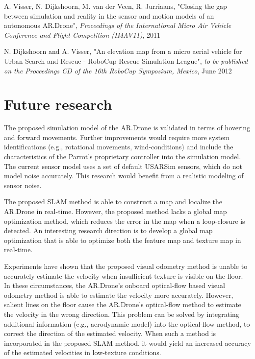 \vspace{\baselineskip}

A. Visser, N. Dijkshoorn, M. van der Veen, R. Jurriaans, "Closing the gap between simulation and reality in the sensor and motion models of an autonomous AR.Drone", \textit{Proceedings of the International Micro Air Vehicle Conference and Flight Competition (IMAV11)}, 2011

\vspace{\baselineskip}

N. Dijkshoorn and A. Visser, "An elevation map from a micro aerial vehicle for Urban Search and Rescue - RoboCup Rescue Simulation League", \textit{to be published on the Proceedings CD of the 16th RoboCup Symposium, Mexico}, June 2012

\section{Future research}
\label{sec:conclusions-future}

The proposed simulation model of the AR.Drone is validated in terms of hovering and forward movements. 
Further improvements would require more system identifications (e.g., rotational movements, wind-conditions) and include the characteristics of the Parrot's proprietary controller into the simulation model. 
The current sensor model uses a set of default USARSim sensors, which do not model noise accurately.
This research would benefit from a realistic modeling of sensor noise.

The proposed SLAM method is able to construct a map and localize the AR.Drone in real-time.
However, the proposed method lacks a global map optimization method, which reduces the error in the map when a loop-closure is detected.
An interesting research direction is to develop a global map optimization that is able to optimize both the feature map and texture map in real-time.

Experiments have shown that the proposed visual odometry method is unable to accurately estimate the velocity when insufficient texture is visible on the floor.
In these circumstances, the AR.Drone's onboard optical-flow based visual odometry method is able to estimate the velocity more accurately.
However, salient lines on the floor cause the AR.Drone's optical-flow method to estimate the velocity in the wrong direction.
This problem can be solved by integrating additional information (e.g., aerodynamic model) into the optical-flow method, to correct the direction of the estimated velocity.
When such a method is incorporated in the proposed SLAM method, it would yield an increased accuracy of the estimated velocities in low-texture conditions.

